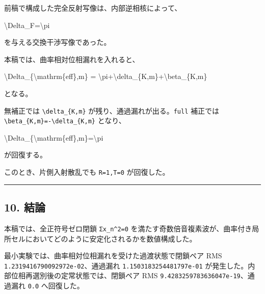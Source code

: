 \documentclass[
  a4paper,
]{article}
\newenvironment{Shaded}{}{}
\newcommand{\NormalTok}[1]{#1}
\begin{document}
前稿で構成した完全反射写像は、内部逆相核によって、

\begin{Shaded}
\begin{Highlighting}[]
\NormalTok{\textbackslash{}Delta\_F=\textbackslash{}pi}
\end{Highlighting}
\end{Shaded}

を与える交換干渉写像であった。

本稿では、曲率相対位相漏れを入れると、

\begin{Shaded}
\begin{Highlighting}[]
\NormalTok{\textbackslash{}Delta\_\{\textbackslash{}mathrm\{eff\},m\}}
\NormalTok{=}
\NormalTok{\textbackslash{}pi+\textbackslash{}delta\_\{K,m\}+\textbackslash{}beta\_\{K,m\}}
\end{Highlighting}
\end{Shaded}

となる。

無補正では \texttt{\textbackslash{}delta\_\{K,m\}}
が残り、通過漏れが出る。\texttt{full} 補正では
\texttt{\textbackslash{}beta\_\{K,m\}=-\textbackslash{}delta\_\{K,m\}}
となり、

\begin{Shaded}
\begin{Highlighting}[]
\NormalTok{\textbackslash{}Delta\_\{\textbackslash{}mathrm\{eff\},m\}=\textbackslash{}pi}
\end{Highlighting}
\end{Shaded}

が回復する。

このとき、片側入射散乱でも \texttt{R=1,T=0} が回復した。

\begin{center}\rule{0.5\linewidth}{0.5pt}\end{center}

\subsection{10. 結論}\label{ux7d50ux8ad6}

本稿では、全正符号ゼロ閉鎖 \texttt{Σx\_n\^{}2=0}
を満たす奇数倍音複素波が、曲率付き局所セルにおいてどのように安定化されるかを数値構成した。

最小実験では、曲率相対位相漏れを受けた過渡状態で閉鎖ペア RMS
\texttt{1.2319416790092972e-02}、通過漏れ
\texttt{1.1503183254481797e-01}
が発生した。内部位相再選別後の定常状態では、閉鎖ペア RMS
\texttt{9.4283259783636047e-19}、通過漏れ \texttt{0.0} へ回復した。
\end{document}
